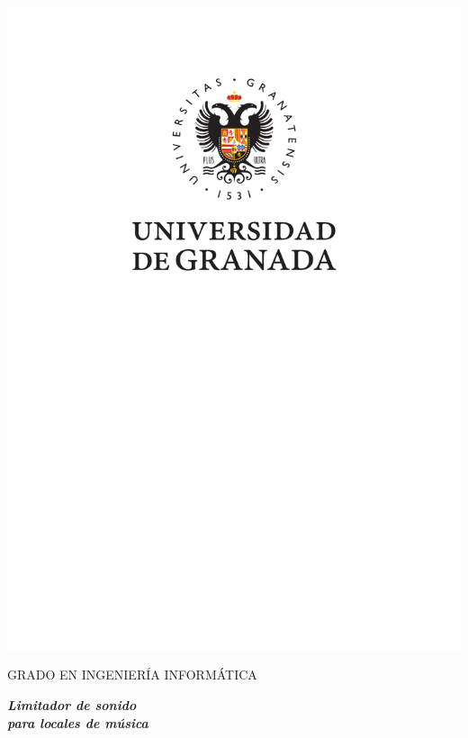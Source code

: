\begin{center}
\includegraphics[scale=1.45]{figuras/logo_ugr.pdf}
\par\end{center}

\begin{center}
GRADO EN INGENIERÍA INFORMÁTICA\par\end{center}

\begin{center}
\vspace*{0.1cm}
\par\end{center}

\begin{center}
\textbf{\emph{\LARGE {Limitador de sonido}}} \\
\textbf{\emph{\LARGE {para locales de música}}}
\par\end{center}{\Large \par}

